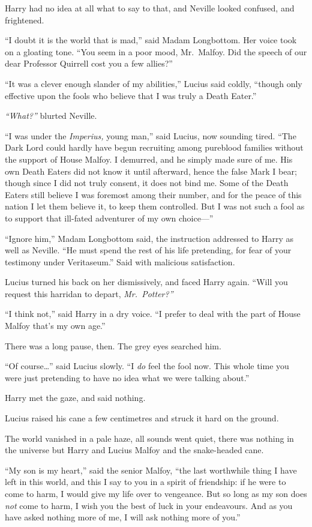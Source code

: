 Harry had no idea at all what to say to that, and Neville looked
confused, and frightened.

``I doubt it is the world that is mad,'' said Madam Longbottom. Her
voice took on a gloating tone. ``You seem in a poor mood, Mr.~Malfoy.
Did the speech of our dear Professor Quirrell cost you a few allies?''

``It was a clever enough slander of my abilities,'' Lucius said coldly,
``though only effective upon the fools who believe that I was truly a
Death Eater.''

\emph{``What?''} blurted Neville.

``I was under the \emph{Imperius,} young man,'' said Lucius, now
sounding tired. ``The Dark Lord could hardly have begun recruiting among
pureblood families without the support of House Malfoy. I demurred, and
he simply made sure of me. His own Death Eaters did not know it until
afterward, hence the false Mark I bear; though since I did not truly
consent, it does not bind me. Some of the Death Eaters still believe I
was foremost among their number, and for the peace of this nation I let
them believe it, to keep them controlled. But I was not such a fool as
to support that ill-fated adventurer of my own choice---''

``Ignore him,'' Madam Longbottom said, the instruction addressed to
Harry as well as Neville. ``He must spend the rest of his life
pretending, for fear of your testimony under Veritaseum.'' Said with
malicious satisfaction.

Lucius turned his back on her dismissively, and faced Harry again.
``Will you request this harridan to depart, \emph{Mr.~Potter?''}

``I think not,'' said Harry in a dry voice. ``I prefer to deal with the
part of House Malfoy that's my own age.''

There was a long pause, then. The grey eyes searched him.

``Of course\ldots{}'' said Lucius slowly. ``I \emph{do} feel the fool
now. This whole time you were just pretending to have no idea what we
were talking about.''

Harry met the gaze, and said nothing.

Lucius raised his cane a few centimetres and struck it hard on the
ground.

The world vanished in a pale haze, all sounds went quiet, there was
nothing in the universe but Harry and Lucius Malfoy and the snake-headed
cane.

``My son is my heart,'' said the senior Malfoy, ``the last worthwhile
thing I have left in this world, and this I say to you in a spirit of
friendship: if he were to come to harm, I would give my life over to
vengeance. But so long as my son does \emph{not} come to harm, I wish
you the best of luck in your endeavours. And as you have asked nothing
more of me, I will ask nothing more of you.''

